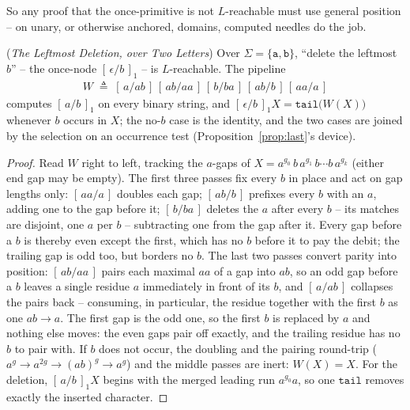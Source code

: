 \documentclass[runningheads,envcountsect]{llncs}
\begin{document}
So any proof that the once-primitive is not $L$-reachable must use general position -- on unary, or otherwise anchored, domains, computed needles do the job.

\begin{proposition}
    (\emph{The Leftmost Deletion, over Two Letters})
    \label{prop:del-leftmost}
    Over $\Sigma = \{\mathtt{a},\mathtt{b}\}$, ``delete the leftmost $b$'' -- the once-node $[\,\epsilon/b\,]_1$ -- is $L$-reachable. The pipeline
    \begin{align}
        W \;\triangleq\; [\,a/ab\,]\,[\,ab/aa\,]\,[\,b/ba\,]\,[\,ab/b\,]\,[\,aa/a\,]
    \end{align}
    computes $[\,a/b\,]_1$ on every binary string, and $[\,\epsilon/b\,]_1 X = \mathtt{tail}\big(W(X)\big)$ whenever $b$ occurs in $X$; the no-$b$ case is the identity, and the two cases are joined by the selection on an occurrence test (Proposition~\ref{prop:last}'s device).
\end{proposition}

\begin{proof}
    Read $W$ right to left, tracking the $a$-gaps of $X = a^{g_0}\,b\,a^{g_1}\,b \cdots b\,a^{g_k}$ (either end gap may be empty). The first three passes fix every $b$ in place and act on gap lengths only: $[\,aa/a\,]$ doubles each gap; $[\,ab/b\,]$ prefixes every $b$ with an $a$, adding one to the gap before it; $[\,b/ba\,]$ deletes the $a$ after every $b$ -- its matches are disjoint, one $a$ per $b$ -- subtracting one from the gap after it. Every gap before a $b$ is thereby even except the first, which has no $b$ before it to pay the debit; the trailing gap is odd too, but borders no $b$. The last two passes convert parity into position: $[\,ab/aa\,]$ pairs each maximal $aa$ of a gap into $ab$, so an odd gap before a $b$ leaves a single residue $a$ immediately in front of its $b$, and $[\,a/ab\,]$ collapses the pairs back -- consuming, in particular, the residue together with the first $b$ as one $ab \to a$. The first gap is the odd one, so the first $b$ is replaced by $a$ and nothing else moves: the even gaps pair off exactly, and the trailing residue has no $b$ to pair with. If $b$ does not occur, the doubling and the pairing round-trip ($a^{g} \to a^{2g} \to (ab)^{g} \to a^{g}$) and the middle passes are inert: $W(X) = X$. For the deletion, $[\,a/b\,]_1 X$ begins with the merged leading run $a^{g_0}a$, so one $\mathtt{tail}$ removes exactly the inserted character.
\end{proof}
\end{document}

